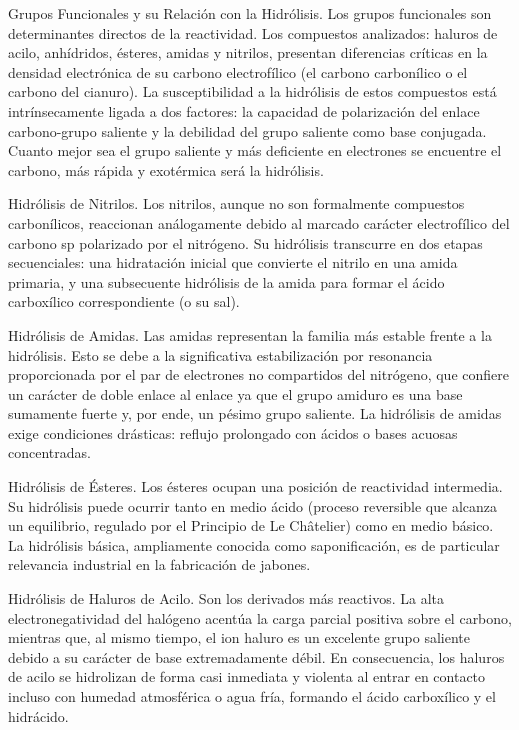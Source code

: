 \documentclass{article}
\begin{document}
Grupos Funcionales y su Relación con la Hidrólisis.
Los grupos funcionales son determinantes directos de la reactividad. Los compuestos analizados: haluros de acilo, anhídridos, ésteres, amidas y nitrilos, presentan diferencias críticas en la densidad electrónica de su carbono electrofílico (el carbono carbonílico o el carbono del cianuro). La susceptibilidad a la hidrólisis de estos compuestos está intrínsecamente ligada a dos factores: la capacidad de polarización del enlace carbono-grupo saliente y la debilidad del grupo saliente como base conjugada. Cuanto mejor sea el grupo saliente y más deficiente en electrones se encuentre el carbono, más rápida y exotérmica será la hidrólisis.

Hidrólisis de Nitrilos.
Los nitrilos, aunque no son formalmente compuestos carbonílicos, reaccionan análogamente debido al marcado carácter electrofílico del carbono sp polarizado por el nitrógeno. Su hidrólisis transcurre en dos etapas secuenciales: una hidratación inicial que convierte el nitrilo en una amida primaria, y una subsecuente hidrólisis de la amida para formar el ácido carboxílico correspondiente (o su sal).

Hidrólisis de Amidas.
Las amidas representan la familia más estable frente a la hidrólisis. Esto se debe a la significativa estabilización por resonancia proporcionada por el par de electrones no compartidos del nitrógeno, que confiere un carácter de doble enlace al enlace ya que el grupo amiduro es una base sumamente fuerte y, por ende, un pésimo grupo saliente. La hidrólisis de amidas exige condiciones drásticas: reflujo prolongado con ácidos o bases acuosas concentradas.

Hidrólisis de Ésteres. 
Los ésteres ocupan una posición de reactividad intermedia. Su hidrólisis puede ocurrir tanto en medio ácido (proceso reversible que alcanza un equilibrio, regulado por el Principio de Le Châtelier) como en medio básico. La hidrólisis básica, ampliamente conocida como saponificación, es de particular relevancia industrial en la fabricación de jabones.

Hidrólisis de Haluros de Acilo.
Son los derivados más reactivos. La alta electronegatividad del halógeno acentúa la carga parcial positiva sobre el carbono, mientras que, al mismo tiempo, el ion haluro es un excelente grupo saliente debido a su carácter de base extremadamente débil. En consecuencia, los haluros de acilo se hidrolizan de forma casi inmediata y violenta al entrar en contacto incluso con humedad atmosférica o agua fría, formando el ácido carboxílico y el hidrácido.
\end{document}
